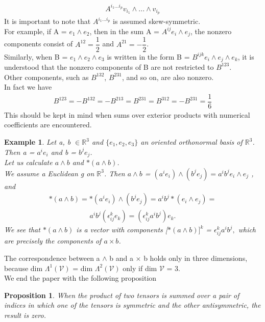 \documentclass[12pt,a4paper]{article}
\newtheorem{exmp}{Example}[section]
\newtheorem{prop}{Proposition}
\begin{document}
\begin{align*}
A^{i_1 ... i_p} v_{i_1} \wedge ... \wedge v_{i_p}
\end{align*}
It is important to note that $A^{i_1 ... i_p}$ is assumed skew-symmetric. \\For example,
if A = $e_1 \wedge e_2$, then in the sum A = $A^{ij} e_i \wedge e_j$, the nonzero components consist of $A^{12} = \dfrac{1}{2}$ and $A^{21} = -\dfrac{1}{2}$. \\Similarly, when B = $e_1 \wedge e_2 \wedge e_3$ is written in the form B = $B^{ijk} e_i \wedge e_j \wedge e_k$, it is understood that the nonzero components of B are not restricted to  $B^{123}$. \\Other components, such as $B^{132}$, $B^{231}$, and so on, are also nonzero.\\ In fact we have\\
\begin{align*}
B^{123} = -B^{132} = -B^{213} = B^{231} = B^{312} = -B^{231} = \dfrac{1}{6}
\end{align*}
This should be kept in mind when sums over exterior products with numerical coefficients are encountered.
\begin{exmp}
Let a, b $\in \mathbb{R}^3$ and $\{e_1, e_2, e_3\}$ an oriented orthonormal basis of $\mathbb{R}^3$. Then a = $a^i e_i$ and b = $b^j e_j$.\\
Let us calculate  $a \wedge b$ and $\ast(a \wedge b)$.\\
We assume a Euclidean g on $\mathbb{R}^3$. Then $a \wedge b$ = $( a^i e_i) \wedge (b^j e_j) = a^i b^j e_i \wedge e_j$ , and
\begin{align*}
\ast (a \wedge b) = \ast (a ^ i e_i) \wedge (b^j e_j) = a^i b^j \ast (e_i \wedge e_j)=
\end{align*}
\begin{align*}
 a^i b^j ( \epsilon^k_{ij} e_k) = (\epsilon^k_{ij} a^i b^j) e_k.
\end{align*}
We see that $\ast (a \wedge b)$ is a vector with components [$\ast(a \wedge b)]^k$ = $\epsilon^k_{ij} a^i b^j,$ which are precisely the components of $a \times b$.
\end{exmp}
The correspondence between a $\wedge$ b and a $\times$ b holds only in three dimensions, because dim $\Lambda^{1}(\mathcal{V})$ = dim $\Lambda^{2}(\mathcal{V})$ only if dim $\mathcal{V}$ = 3.
\\We end the paper with the following proposition
\begin{prop}
When the product of two tensors is summed over a pair of indices in which one of the tensors is symmetric and the other antisymmetric, the result is zero.
\end{prop}
\end{document}
